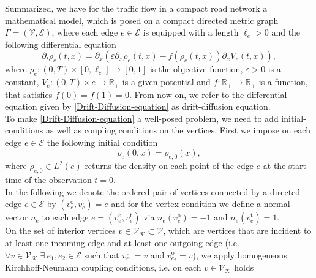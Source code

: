 Summarized, we have for the traffic flow in a compact road network a mathematical model, which is posed on a compact directed metric graph $\Gamma =  \left( \mathcal{V}, \mathcal{E} \right) $, where each edge $e \in \mathcal{E}$ is equipped with a length $\ell_e > 0$ and the following differential equation
\begin{equation} 
    \label{Drift-Diffusion-equation}
    \partial_t \rho_e  \left( t,x \right)  = \partial_x  \left( \varepsilon \partial_x \rho_e  \left( t,x \right)  - f \left( \rho_e  \left( t,x \right)   \right)  \partial_x V_e  \left( t,x \right)  \right) ,
\end{equation}
where $\rho_e \colon  \left( 0, T \right)  \times \left[ 0, \ell_e \right] \to \left[ 0, 1 \right]$ is the objective function, $\varepsilon > 0$ is a constant, $V_e \colon  \left( 0,T \right)  \times e \to \mathbb{R}_{+}$ is a given potential and $f \colon \mathbb{R}_{+} \to \mathbb{R}_{+}$ is a function, that satisfies $f \left( 0 \right)  = f \left( 1 \right)  = 0$. From now on, we refer to the differential equation given by \cref{Drift-Diffusion-equation} as drift-diffusion equation. \\
To make \cref{Drift-Diffusion-equation} a well-posed problem, we need to add initial-conditions as well as coupling conditions on the vertices. First we impose on each edge $e \in \mathcal{E}$ the following initial condition
\begin{equation}
    \label{eq:initial_conditions}
    \rho_e \left( 0,x \right)  = \rho_{e, 0} \left( x \right) ,
\end{equation}
where $\rho_{e, 0} \in L^2 \left( e \right) $ returns the density on each point of the edge $e$ at the start time of the observation $t=0$. \\ 
In the following we denote the ordered pair of vertices connected by a directed edge $e \in \mathcal{E}$ by $ \left( v^{\operatorname{o}}_e, v^{\operatorname{t}}_e \right)  = e$ and for the vertex condition we define a normal vector $n_e$ to each edge $e =  \left( v^{\operatorname{o}}_e, v^{\operatorname{t}}_e \right) $ via $n_e \left( v^{\operatorname{o}}_e \right)  = -1$ and $n_e \left( v^{\operatorname{t}}_e \right)  = 1$. \\
On the set of interior vertices $v \in \mathcal{V}_\mathcal{K} \subset \mathcal{V}$, which are vertices that are incident to at least one incoming edge and at least one outgoing edge (i.e. $\forall v \in \mathcal{V}_\mathcal{K} \; \exists \ e_1, e_2 \in \mathcal{E}$ such that $v^{\operatorname{t}}_{e_1} = v$ and $v^{\operatorname{o}}_{e_2} = v$), we apply homogeneous Kirchhoff-Neumann coupling conditions, i.e. on each $v \in \mathcal{V}_\mathcal{K}$ holds
